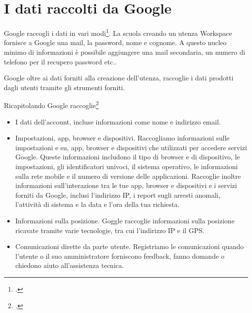 \section{I dati raccolti da Google}
\textenglish{Google} raccogli i dati in vari modi\footcite{Google2022a}. La scuola creando un utenza Workspace fornisce a Google una mail, la password,  nome e  cognome. A questo nucleo minimo di informazioni è possibile aggiungere una mail secondaria, un numero di telefono per il recupero password etc..

Google oltre ai dati forniti alla creazione dell'utenza, raccoglie i dati prodotti dagli utenti tramite gli strumenti forniti. 

Ricapitolando Google raccoglie\footcite{Google2022a}
\begin{itemize}
	\item I dati dell'account, incluse informazioni come nome e indirizzo email.
	\item Impostazioni, app, browser e dispositivi. Raccogliamo informazioni sulle  impostazioni e su, app, browser e dispositivi che utilizzati per accedere  servizi Google. Queste informazioni includono il tipo di browser e di dispositivo, le impostazioni, gli identificatori univoci, il sistema operativo, le informazioni sulla rete mobile e il numero di versione delle applicazioni. Raccoglie inoltre informazioni sull'interazione tra le tue app, browser e dispositivi e i servizi forniti da Google, inclusi l'indirizzo IP, i report sugli arresti anomali, l'attività di sistema e la data e l'ora della tua richiesta.
	\item Informazioni sulla posizione. Goggle raccoglie informazioni sulla posizione ricavate tramite varie tecnologie, tra cui l'indirizzo IP e il GPS.
	\item Comunicazioni dirette da parte utente. Registriamo le comunicazioni quando l'utente o il suo amministratore forniscono feedback, fanno domande o chiedono aiuto all'assistenza tecnica.
\end{itemize}
